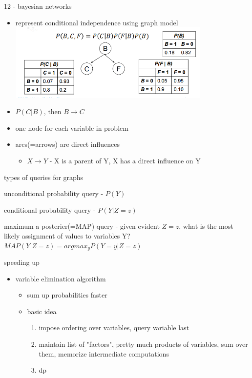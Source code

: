 \documentclass[11pt]{article}
\newcommand{\ee}[1]{\ensuremath{#1}}
\begin{document}
\begin{description}
\item 12 - bayesian networks
\begin{itemize}
	\item represent conditional independence using graph model
	\\ \includegraphics[width=100mm,scale=1]{bayes_net}
	\item \ee{P(C \vert B)}, then \ee{B \rightarrow C}
	\item one node for each variable in problem
	\item arcs(=arrows) are direct influences
	\begin{itemize}
		\item \ee{X \rightarrow Y} - X is a parent of Y, X has a direct influence on Y
	\end{itemize}
\end{itemize}

\item types of queries for graphs
\begin{description}
	\item unconditional probability query - \ee{P(Y)}
	\item conditional probability query - \ee{P(Y|Z = z)}
	\item maximum a posterier(=MAP) query - given evident \ee{Z = z}, what is the most likely assignment of values to variables Y? \\ \ee{MAP(Y|Z = z) = argmax_yP(Y=y|Z=z)}
\end{description}

\item speeding up
\begin{itemize}
	\item variable elimination algorithm
	\begin{itemize}
		\item sum up probabilities faster
		\item basic idea
		\begin{enumerate}
			\item impose ordering over variables, query variable last
			\item maintain list of "factors", pretty much products of variables, sum over them, memorize intermediate computations
			\item dp
		\end{enumerate}


\end{itemize}
\end{itemize}
\end{description}
\end{document}
